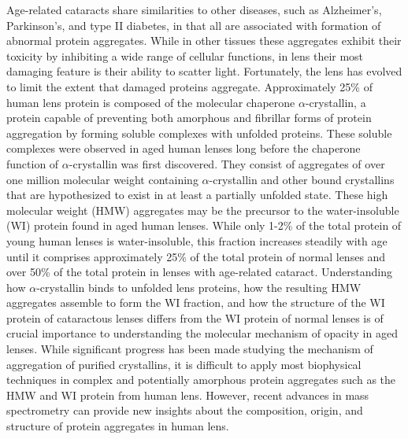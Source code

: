 \documentclass[arial,11pt]{article}
\begin{document}
Age-related cataracts share similarities to other diseases, such as Alzheimer's, Parkinson's, and type II diabetes, in that all are associated with formation of abnormal protein aggregates. While in other tissues these aggregates exhibit their toxicity by inhibiting a wide range of cellular functions, in lens their most damaging feature is their ability to scatter light. Fortunately, the lens has evolved to limit the extent that damaged proteins aggregate. Approximately 25\% of human lens protein is composed of the molecular chaperone $\alpha$-crystallin, a protein capable of preventing both amorphous and fibrillar forms of protein aggregation by forming soluble complexes with unfolded proteins.  These soluble complexes were observed in aged human lenses long before the chaperone function of  $\alpha$-crystallin was first discovered.  They consist of aggregates of over one million molecular weight containing  $\alpha$-crystallin and other bound crystallins~\cite{srivastava08} that are hypothesized to exist in at least a partially unfolded state.   These high molecular weight (HMW) aggregates may be the precursor to the water-insoluble (WI) protein found in aged human lenses.  While only 1-2\% of the total protein of young human lenses is water-insoluble, this fraction increases steadily with age until it comprises approximately 25\% of the total protein of normal lenses and over 50\% of the total protein in lenses with age-related cataract.  Understanding how $\alpha$-crystallin binds to unfolded lens proteins, how the resulting HMW aggregates assemble to form the WI fraction, and how the structure of the WI protein of cataractous lenses differs from the WI protein of normal lenses is of crucial importance to understanding the molecular mechanism of opacity in aged lenses.   While significant progress has been made studying the mechanism of aggregation of purified crystallins, it is difficult to apply most biophysical techniques in complex and potentially amorphous protein aggregates such as the HMW and WI protein from human lens. However, recent advances in mass spectrometry can provide new insights about the composition, origin, and structure of protein aggregates in human lens.
\end{document}
